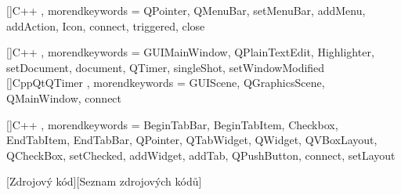[]{C++}{
    , morendkeywords = {QPointer, QMenuBar, setMenuBar, addMenu, addAction, Icon, connect, triggered, close}
}

[]{C++}{
    , morendkeywords = {GUIMainWindow, QPlainTextEdit, Highlighter, setDocument, document, QTimer, singleShot, setWindowModified}
}
[]{CppQtQTimer}{
    , morendkeywords = {GUIScene, QGraphicsScene, QMainWindow, connect}
}

[]{C++}{
    , morendkeywords = {
        BeginTabBar, BeginTabItem, Checkbox, EndTabItem, EndTabBar,
        QPointer, QTabWidget, QWidget, QVBoxLayout, QCheckBox, setChecked, addWidget, addTab, QPushButton, connect, setLayout
    }
}

\makeatletter
\lst@InputCatcodes
\def\lst@DefEC{
	\lst@CCECUse \lst@ProcessLetter
	^^80^^81^^82^^83^^84^^85^^86^^87^^88^^89^^8a^^8b^^8c^^8d^^8e^^8f
	^^90^^91^^92^^93^^94^^95^^96^^97^^98^^99^^9a^^9b^^9c^^9d^^9e^^9f
	^^a0^^a1^^a2^^a3^^a4^^a5^^a6^^a7^^a8^^a9^^aa^^ab^^ac^^ad^^ae^^af
	^^b0^^b1^^b2^^b3^^b4^^b5^^b6^^b7^^b8^^b9^^ba^^bb^^bc^^bd^^be^^bf
	^^c0^^c1^^c2^^c3^^c4^^c5^^c6^^c7^^c8^^c9^^ca^^cb^^cc^^cd^^ce^^cf
	^^d0^^d1^^d2^^d3^^d4^^d5^^d6^^d7^^d8^^d9^^da^^db^^dc^^dd^^de^^df
	^^e0^^e1^^e2^^e3^^e4^^e5^^e6^^e7^^e8^^e9^^ea^^eb^^ec^^ed^^ee^^ef
	^^f0^^f1^^f2^^f3^^f4^^f5^^f6^^f7^^f8^^f9^^fa^^fb^^fc^^fd^^fe^^ff
	^^^^010c^^^^010d%
    ^^^^0158^^^^0159%
    ^^^^011a^^^^011b%
    ^^^^010e^^^^010f%
    ^^^^0160^^^^0161%
    ^^^^016e^^^^016f%
    ^^^^0147^^^^0148%
    ^^^^0164^^^^0165%
    ^^^^017d^^^^017e%
    ^^^^201e^^^^201c%
	^^00}
\lst@RestoreCatcodes
\makeatother

\usepackage{caption}
[Zdrojový kód][Seznam zdrojových kódů]
